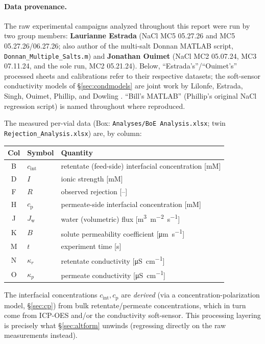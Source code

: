 \documentclass[11pt]{article}
\newcommand{\Jw}{J_{\mathrm{w}}}
\newcommand{\cint}{c_{\mathrm{int}}}
\newcommand{\cp}{c_{\mathrm{p}}}
\begin{document}
\paragraph{Data provenance.} The raw experimental campaigns analyzed
throughout this report were run by two group members: \textbf{Laurianne
Estrada} (NaCl MC5 05.27.26 and  MC5 05.27.26/06.27.26; also author
of the multi-salt Donnan MATLAB script, \texttt{Donnan\_Multiple\_Salts.m})
and \textbf{Jonathan Ouimet} (NaCl MC2 05.07.24,  MC3 07.11.24, and
the sole  run, MC2 05.21.24). Below, ``Estrada's''/``Ouimet's''
processed sheets and calibrations refer to their respective datasets; the
soft-sensor conductivity models of \S\ref{sec:condmodels} are joint work by
Lilonfe, Estrada, Singh, Ouimet, Phillip, and Dowling
\cite{lilonfe2025softsensors}. ``Bill's MATLAB'' (Phillip's original NaCl
regression script) is named throughout where reproduced.

The measured per-vial data (Box: \texttt{Analyses/\allowbreak{}BoE Analysis.xlsx}; twin
\texttt{Rejection\_\allowbreak{}Analysis.xlsx}) are, by column:
\begin{center}
\begin{tabular}{cll}
\toprule
Col & Symbol & Quantity \\
\midrule
B & $\cint$ & retentate (feed-side) interfacial concentration [\si{mM}]\\
D & $I$     & ionic strength [\si{mM}]\\
F & $R$     & observed rejection [--]\\
H & $\cp$   & permeate-side interfacial concentration [\si{mM}]\\
J & $\Jw$   & water (volumetric) flux [\si{m^3.m^{-2}.s^{-1}}]\\
K & $B$     & solute permeability coefficient [\si{\micro m.s^{-1}}]\\
M & $t$     & experiment time [\si{s}]\\
N & $\kappa_r$ & retentate conductivity [\si{\micro S.cm^{-1}}]\\
O & $\kappa_p$ & permeate conductivity [\si{\micro S.cm^{-1}}]\\
\bottomrule
\end{tabular}
\end{center}
The interfacial concentrations $\cint,\cp$ are \emph{derived} (via a
concentration-polarization model, \S\ref{sec:cp}) from bulk retentate/permeate
concentrations, which in turn come from ICP-OES and/or the conductivity
soft-sensor. This processing layering is precisely what \S\ref{sec:altform}
unwinds (regressing directly on the raw measurements instead).
\end{document}
